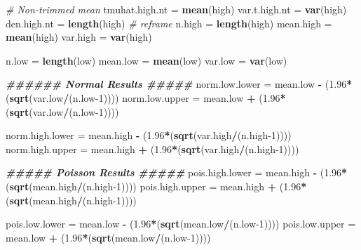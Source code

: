\documentclass[
]{article}
\newenvironment{Shaded}{\begin{snugshade}}{\end{snugshade}}
\newcommand{\CommentTok}[1]{\textcolor[rgb]{0.56,0.35,0.01}{\textit{#1}}}
\newcommand{\DecValTok}[1]{\textcolor[rgb]{0.00,0.00,0.81}{#1}}
\newcommand{\DocumentationTok}[1]{\textcolor[rgb]{0.56,0.35,0.01}{\textbf{\textit{#1}}}}
\newcommand{\FloatTok}[1]{\textcolor[rgb]{0.00,0.00,0.81}{#1}}
\newcommand{\FunctionTok}[1]{\textcolor[rgb]{0.13,0.29,0.53}{\textbf{#1}}}
\newcommand{\NormalTok}[1]{#1}
\newcommand{\OtherTok}[1]{\textcolor[rgb]{0.56,0.35,0.01}{#1}}
\newcommand{\SpecialCharTok}[1]{\textcolor[rgb]{0.81,0.36,0.00}{\textbf{#1}}}
\begin{document}
\begin{Shaded}
\begin{Highlighting}[]
\CommentTok{\# Non{-}trimmed mean}
\NormalTok{tmuhat.high.nt }\OtherTok{=} \FunctionTok{mean}\NormalTok{(high)}
\NormalTok{var.t.high.nt }\OtherTok{=} \FunctionTok{var}\NormalTok{(high)}
\NormalTok{den.high.nt }\OtherTok{=} \FunctionTok{length}\NormalTok{(high)}
\CommentTok{\# reframe}
\NormalTok{n.high }\OtherTok{=} \FunctionTok{length}\NormalTok{(high)}
\NormalTok{mean.high }\OtherTok{=} \FunctionTok{mean}\NormalTok{(high)}
\NormalTok{var.high }\OtherTok{=} \FunctionTok{var}\NormalTok{(high)}

\NormalTok{n.low }\OtherTok{=} \FunctionTok{length}\NormalTok{(low)}
\NormalTok{mean.low }\OtherTok{=} \FunctionTok{mean}\NormalTok{(low)}
\NormalTok{var.low }\OtherTok{=} \FunctionTok{var}\NormalTok{(low)}

\DocumentationTok{\#\#\#\#\#\# Normal Results \#\#\#\#\#}
\NormalTok{norm.low.lower }\OtherTok{=}\NormalTok{ mean.low }\SpecialCharTok{{-}}\NormalTok{ (}\FloatTok{1.96}\SpecialCharTok{*}\NormalTok{(}\FunctionTok{sqrt}\NormalTok{(var.low}\SpecialCharTok{/}\NormalTok{(n.low}\DecValTok{{-}1}\NormalTok{))))}
\NormalTok{norm.low.upper }\OtherTok{=}\NormalTok{ mean.low }\SpecialCharTok{+}\NormalTok{ (}\FloatTok{1.96}\SpecialCharTok{*}\NormalTok{(}\FunctionTok{sqrt}\NormalTok{(var.low}\SpecialCharTok{/}\NormalTok{(n.low}\DecValTok{{-}1}\NormalTok{))))}

\NormalTok{norm.high.lower }\OtherTok{=}\NormalTok{ mean.high }\SpecialCharTok{{-}}\NormalTok{ (}\FloatTok{1.96}\SpecialCharTok{*}\NormalTok{(}\FunctionTok{sqrt}\NormalTok{(var.high}\SpecialCharTok{/}\NormalTok{(n.high}\DecValTok{{-}1}\NormalTok{))))}
\NormalTok{norm.high.upper }\OtherTok{=}\NormalTok{ mean.high }\SpecialCharTok{+}\NormalTok{ (}\FloatTok{1.96}\SpecialCharTok{*}\NormalTok{(}\FunctionTok{sqrt}\NormalTok{(var.high}\SpecialCharTok{/}\NormalTok{(n.high}\DecValTok{{-}1}\NormalTok{))))}

\DocumentationTok{\#\#\#\#\# Poisson Results \#\#\#\#\#}
\NormalTok{pois.high.lower }\OtherTok{=}\NormalTok{ mean.high }\SpecialCharTok{{-}}\NormalTok{ (}\FloatTok{1.96}\SpecialCharTok{*}\NormalTok{(}\FunctionTok{sqrt}\NormalTok{(mean.high}\SpecialCharTok{/}\NormalTok{(n.high}\DecValTok{{-}1}\NormalTok{))))}
\NormalTok{pois.high.upper }\OtherTok{=}\NormalTok{ mean.high }\SpecialCharTok{+}\NormalTok{ (}\FloatTok{1.96}\SpecialCharTok{*}\NormalTok{(}\FunctionTok{sqrt}\NormalTok{(mean.high}\SpecialCharTok{/}\NormalTok{(n.high}\DecValTok{{-}1}\NormalTok{))))}

\NormalTok{pois.low.lower }\OtherTok{=}\NormalTok{ mean.low }\SpecialCharTok{{-}}\NormalTok{ (}\FloatTok{1.96}\SpecialCharTok{*}\NormalTok{(}\FunctionTok{sqrt}\NormalTok{(mean.low}\SpecialCharTok{/}\NormalTok{(n.low}\DecValTok{{-}1}\NormalTok{))))}
\NormalTok{pois.low.upper }\OtherTok{=}\NormalTok{ mean.low }\SpecialCharTok{+}\NormalTok{ (}\FloatTok{1.96}\SpecialCharTok{*}\NormalTok{(}\FunctionTok{sqrt}\NormalTok{(mean.low}\SpecialCharTok{/}\NormalTok{(n.low}\DecValTok{{-}1}\NormalTok{))))}



\end{Highlighting}
\end{Shaded}
\end{document}
